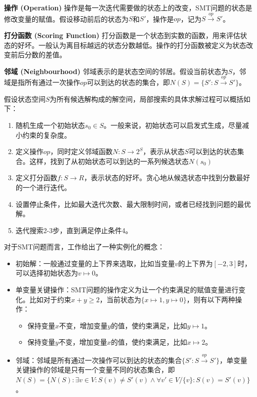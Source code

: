 \begin{definition}{\textbf{操作 (Operation)}}
操作是每一次迭代需要做的状态上的改变，SMT问题的状态是修改变量的赋值。假设移动前后的状态为$S$和$S'$，操作是$op$，记为$S \xrightarrow{op} S'$。
\end{definition}

\begin{definition}{\textbf{打分函数 (Scoring Function)}}
打分函数是一个状态到实数的函数，用来评估状态的好坏。一般认为离目标越远的状态分数越低。操作的打分函数被定义为状态改变前后分数的差值。
\end{definition}

\begin{definition}{\textbf{邻域 (Neighbourhood)}}
邻域表示的是状态空间的邻居。假设当前状态为$S$，邻域是指所有通过一次操作$op$可以到达的状态的集合，即$N(S) = \{S' : S \xrightarrow{op} S'\}$。
\end{definition}

假设状态空间$S$为所有候选解构成的解空间，局部搜索的具体求解过程可以概括如下：
\begin{enumerate}
    \item 随机生成一个初始状态$s_0 \in S$。一般来说，初始状态可以启发式生成，尽量减小约束的复杂度。
    \item 定义操作$op$，同时定义邻域函数$N: S \rightarrow 2^S$，表示从状态$S$可以到达的状态集合。这样，找到了从初始状态可以到达的一系列候选状态$N(s_0)$
    \item 定义打分函数$f: S \rightarrow R$，表示状态的好坏。贪心地从候选状态中找到分数最好的一个进行迭代。
    \item 设置停止条件，比如最大迭代次数、最大限制时间，或者已经找到问题的最优解。
    \item 迭代搜索2-3步，直到满足停止条件4。
\end{enumerate}
对于SMT问题而言，工作\cite{CaiLZ2023}给出了一种实例化的概念：
\begin{itemize}
    \item 初始解：一般通过变量的上下界来选取，比如当变量$v$的上下界为$[-2, 3]$时，可以选择初始状态为$v \mapsto 0$。
    \item 单变量关键操作：SMT问题的操作定义为让一个约束满足的赋值变量进行变化。比如对于约束$x + y \geq 2$，当前状态为$\{x \mapsto 1, y \mapsto 0\}$，则有以下两种操作：
    \begin{itemize}
        \item 保持变量$x$不变，增加变量$y$的值，使约束满足，比如$y \mapsto 1$。
        \item 保持变量$y$不变，增加变量$x$的值，使约束满足，比如$x \mapsto 2$。
    \end{itemize}

    \item 邻域：邻域是所有通过一次操作可以到达的状态的集合$\{S' : S \xrightarrow{op} S'\}$，单变量关键操作的邻域是只有一个变量不同的状态集合，即$N(S) = \{N(S): \exists v \in V: S(v) \neq S'(v) \land \forall v' \in V / \{v\}: S(v) = S'(v) \}$。
\end{itemize}

